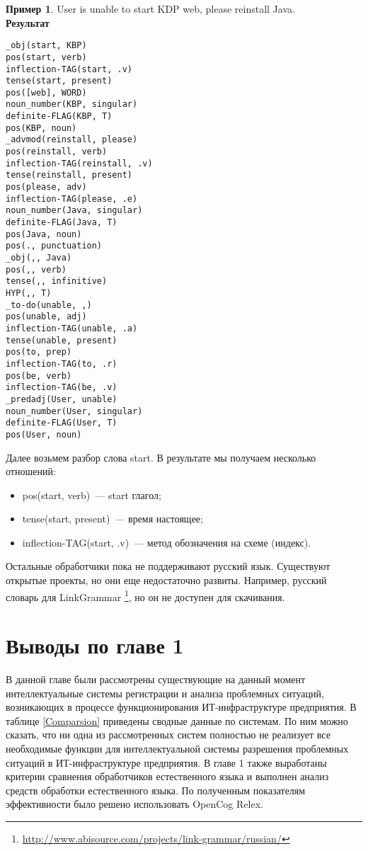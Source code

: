 \textbf{Пример 1}. User is unable to start KDP web, please reinstall Java.\\
\textbf{Результат} 
\begin{lstlisting}
_obj(start, KBP)
pos(start, verb)
inflection-TAG(start, .v)
tense(start, present)
pos([web], WORD)
noun_number(KBP, singular)
definite-FLAG(KBP, T)
pos(KBP, noun)
_advmod(reinstall, please)
pos(reinstall, verb)
inflection-TAG(reinstall, .v)
tense(reinstall, present)
pos(please, adv)
inflection-TAG(please, .e)
noun_number(Java, singular)
definite-FLAG(Java, T)
pos(Java, noun)
pos(., punctuation)
_obj(,, Java)
pos(,, verb)
tense(,, infinitive)
HYP(,, T)
_to-do(unable, ,)
pos(unable, adj)
inflection-TAG(unable, .a)
tense(unable, present)
pos(to, prep)
inflection-TAG(to, .r)
pos(be, verb)
inflection-TAG(be, .v)
_predadj(User, unable)
noun_number(User, singular)
definite-FLAG(User, T)
pos(User, noun)
\end{lstlisting}




Далее возьмем разбор слова start. В результате мы получаем несколько отношений:
\begin{itemize}
	\item pos(start, verb)~--- start глагол;
	\item tense(start, present)~--- время настоящее;
	\item inflection-TAG(start, .v)~--- метод обозначения на схеме (индекс).
\end{itemize} \par
Остальные обработчики пока не поддерживают русский язык. Существуют открытые проекты, но они еще недостаточно развиты. Например, русский словарь для LinkGrammar \footnote{\url{http://www.abisource.com/projects/link-grammar/russian/}}, но он не доступен для скачивания. 




\section{Выводы по главе 1}
В данной главе были рассмотрены существующие на данный момент интеллектуальные системы регистрации и анализа проблемных ситуаций, возникающих в процессе функционирования ИТ-инфраструктуре предприятия.
 В таблице \ref{Comparsion} приведены сводные данные по системам. По ним можно сказать, что ни одна из рассмотренных систем полностью не реализует все необходимые функции для интеллектуальной системы разрешения проблемных ситуаций в ИТ-инфраструктуре предприятия. В главе 1 также выработаны критерии сравнения обработчиков естественного языка и выполнен анализ средств обработки естественного языка. По полученным показателям эффективности было решено использовать OpenCog Relex.

